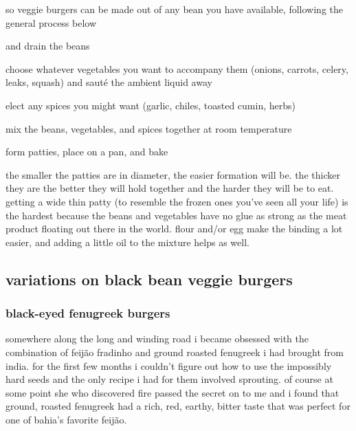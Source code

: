 so veggie burgers can be made out of any bean you have available, following 
the general process below

\begin{algorithm}
  \item {} and drain the beans

  \item choose whatever vegetables you want to accompany them (onions, 
  carrots, celery, leaks, squash) and saut\'{e} the ambient liquid away

  \item elect any spices you might want (garlic, chiles, toasted cumin, herbs)

  \item mix the beans, vegetables, and spices together at room temperature

  \item form patties, place on a pan, and bake
\end{algorithm}

the smaller the patties are in diameter, the easier formation will be. the 
thicker they are the better they will hold together and the harder they will 
be to eat. getting a wide thin patty (to resemble the frozen ones you've seen 
all your life) is the hardest because the beans and vegetables have no glue as 
strong as the meat product floating out there in the world. flour and/or egg 
make the binding a lot easier, and adding a little oil to the mixture helps as 
well.

\subsection{variations on black bean veggie burgers}

\subsubsection{black-eyed fenugreek burgers}

somewhere along the long and winding road i became obsessed with the 
combination of feij\~{a}o fradinho and ground roasted fenugreek i had brought 
from india. for the first few months i couldn't figure out how to use the 
impossibly hard seeds and the only recipe i had for them involved sprouting. 
of course at some point she who discovered fire passed the secret on to me and 
i found that ground, roasted fenugreek had a rich, red, earthy, bitter taste 
that was perfect for one of bahia's favorite feij\~{a}o.

